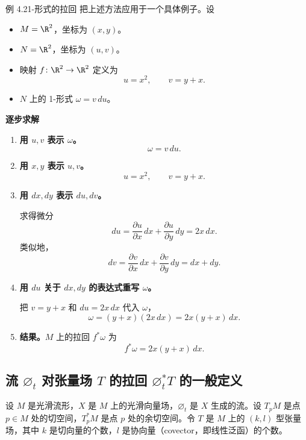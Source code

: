 \begin{statement}{例 4.2}{1-形式的拉回}
把上述方法应用于一个具体例子。设
\begin{itemize}
  \item $M=\R^2$，坐标为 $(x,y)$。
  \item $N=\R^2$，坐标为 $(u,v)$。
  \item 映射 $f\colon\R^2\to\R^2$ 定义为
  \[
    u=x^2,\qquad v=y+x.
  \]
  \item $N$ 上的 1-形式 $\omega=v\,du$。
\end{itemize}

\textbf{逐步求解}
\begin{enumerate}
  \item \textbf{用 $u,v$ 表示 $\omega$。}
  \[
    \omega=v\,du.
  \]
  \item \textbf{用 $x,y$ 表示 $u,v$。}
  \[
    u=x^2,\qquad v=y+x.
  \]
  \item \textbf{用 $dx,dy$ 表示 $du,dv$。}

  求得微分
  \[
    du=\frac{\partial u}{\partial x}\,dx+\frac{\partial u}{\partial y}\,dy=2x\,dx.
  \]
  类似地，
  \[
    dv=\frac{\partial v}{\partial x}\,dx+\frac{\partial v}{\partial y}\,dy=dx+dy.
  \]
  \item \textbf{用 $du$ 关于 $dx,dy$ 的表达式重写 $\omega$。}

  把 $v=y+x$ 和 $du=2x\,dx$ 代入 $\omega$，
  \[
    \omega=(y+x)(2x\,dx)=2x(y+x)\,dx.
  \]
  \item \textbf{结果。}$M$ 上的拉回 $f^*\omega$ 为
  \[
    f^*\omega=2x(y+x)\,dx.
  \]
\end{enumerate}
\end{statement}

\subsection{\texorpdfstring{流 $\varnothing_t$ 对张量场 $T$ 的拉回 $\varnothing_t^*T$ 的一般定义}{流对张量场的拉回的一般定义}}
设 $M$ 是光滑流形，$X$ 是 $M$ 上的光滑向量场，$\varnothing_t$ 是 $X$ 生成的流。设 $T_pM$ 是点 $p\in M$ 处的切空间，$T_p^*M$ 是点 $p$ 处的余切空间。令 $T$ 是 $M$ 上的 $(k,l)$ 型张量场，其中 $k$ 是切向量的个数，$l$ 是协向量（covector，即线性泛函）的个数。

